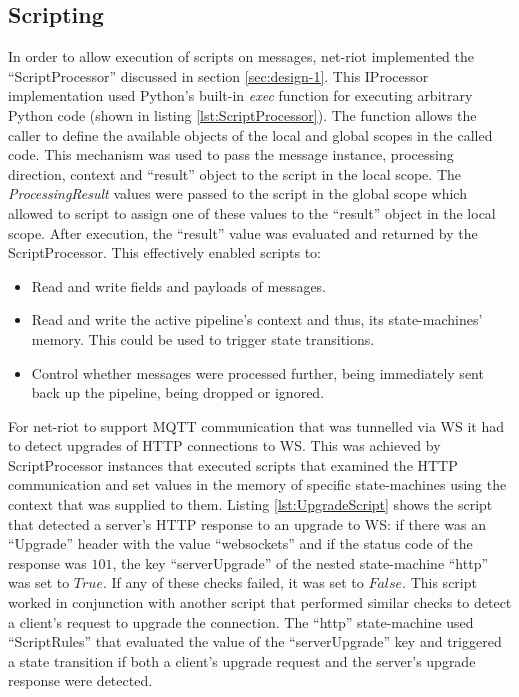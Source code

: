 %

\subsection{Scripting}
In order to allow execution of scripts on messages, net-riot implemented the \enquote{ScriptProcessor} discussed in section \ref{sec:design-1}. This IProcessor implementation used Python's built-in \emph{exec} function for executing arbitrary Python code (shown in listing \ref{lst:ScriptProcessor}). The function allows the caller to define the available objects of the local and global scopes in the called code. This mechanism was used to pass the message instance, processing direction, context and \enquote{result} object to the script in the local scope. The \emph{ProcessingResult} values were passed to the script in the global scope which allowed to script to assign one of these values to the \enquote{result} object in the local scope. After execution, the \enquote{result} value was evaluated and returned by the ScriptProcessor. This effectively enabled scripts to:
\begin{itemize}
    \item Read and write fields and payloads of messages.
    \item Read and write the active pipeline's context and thus, its state-machines' memory. This could be used to trigger state transitions.
    \item Control whether messages were processed further, being immediately sent back up the pipeline, being dropped or ignored.
\end{itemize}

For net-riot to support \ac{MQTT} communication that was tunnelled via \ac{WS} it had to detect upgrades of \ac{HTTP} connections to \ac{WS}. This was achieved by ScriptProcessor instances that executed scripts that examined the \ac{HTTP} communication and set values in the memory of specific state-machines using the context that was supplied to them. Listing \ref{lst:UpgradeScript} shows the script that detected a server's \ac{HTTP} response to an upgrade to \ac{WS}: if there was an \enquote{Upgrade} header with the value \enquote{websockets} and if the status code of the response was $101$, the key \enquote{serverUpgrade} of the nested state-machine \enquote{http} was set to $True$. If any of these checks failed, it was set to $False$. This script worked in conjunction with another script that performed similar checks to detect a client's request to upgrade the connection. The \enquote{http} state-machine used \enquote{ScriptRules} that evaluated the value of the \enquote{serverUpgrade} key and triggered a state transition if both a client's upgrade request and the server's upgrade response were detected.


